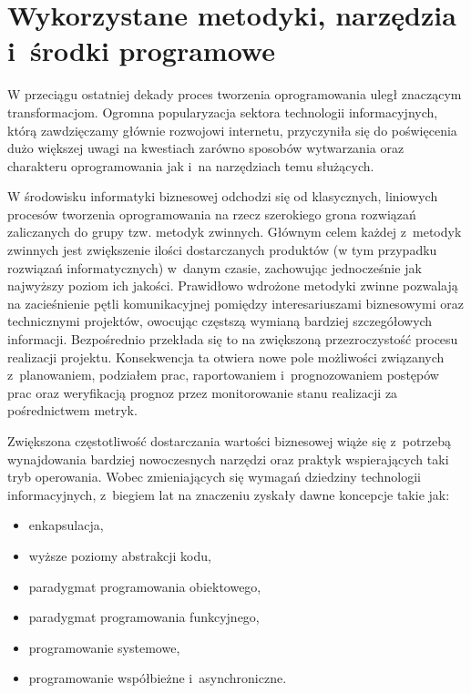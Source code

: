 \section{Wykorzystane metodyki, narzędzia i~środki programowe}\label{ss_internals-technologies}
W przeciągu ostatniej dekady proces tworzenia oprogramowania uległ znaczącym
transformacjom.
Ogromna popularyzacja sektora technologii informacyjnych, którą zawdzięczamy głównie rozwojowi internetu, przyczyniła się do poświęcenia dużo większej uwagi na kwestiach zarówno sposobów wytwarzania oraz charakteru oprogramowania jak i~na narzędziach temu służących.

W środowisku informatyki biznesowej odchodzi się od klasycznych, liniowych procesów tworzenia oprogramowania na rzecz szerokiego grona rozwiązań zaliczanych do grupy tzw. metodyk zwinnych. 
Głównym celem każdej z~metodyk zwinnych jest zwiększenie ilości dostarczanych produktów (w tym przypadku rozwiązań informatycznych) w~danym czasie, zachowując jednocześnie jak najwyższy poziom ich jakości.
Prawidłowo wdrożone metodyki zwinne pozwalają na zacieśnienie pętli komunikacyjnej pomiędzy interesariuszami biznesowymi oraz technicznymi projektów, owocując częstszą wymianą bardziej szczegółowych informacji.
Bezpośrednio przekłada się to na zwiększoną przezroczystość procesu realizacji projektu.
Konsekwencja ta otwiera nowe pole możliwości związanych z~planowaniem, podziałem prac, raportowaniem i~prognozowaniem postępów prac oraz weryfikacją prognoz przez monitorowanie stanu realizacji za pośrednictwem metryk.

\par{
Zwiększona częstotliwość dostarczania wartości biznesowej wiąże się z~potrzebą wynajdowania bardziej nowoczesnych narzędzi oraz praktyk wspierających taki tryb operowania.
Wobec zmieniających się wymagań dziedziny technologii informacyjnych, z~biegiem lat na znaczeniu zyskały dawne koncepcje takie jak:

\begin{itemize}
  \item enkapsulacja,
  \item wyższe poziomy abstrakcji kodu,
  \item paradygmat programowania obiektowego,
  \item paradygmat programowania funkcyjnego,
  \item programowanie systemowe,
  \item programowanie współbieżne i~asynchroniczne.
\end{itemize}
}


